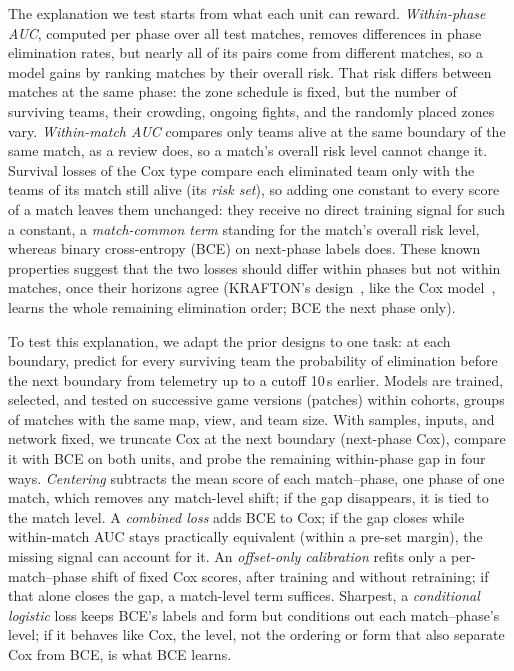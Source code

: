 \documentclass[sigconf,anonymous]{acmart}
\begin{document}
The explanation we test starts from what each unit can reward. \emph{Within-phase AUC}, computed per phase over all test matches, removes differences in phase elimination rates, but nearly all of its pairs come from different matches, so a model gains by ranking matches by their overall risk. That risk differs between matches at the same phase: the zone schedule is fixed, but the number of surviving teams, their crowding, ongoing fights, and the randomly placed zones vary. \emph{Within-match AUC} compares only teams alive at the same boundary of the same match, as a review does, so a match's overall risk level cannot change it. Survival losses of the Cox type compare each eliminated team only with the teams of its match still alive (its \emph{risk set}), so adding one constant to every score of a match leaves them unchanged: they receive no direct training signal for such a constant, a \emph{match-common term} standing for the match's overall risk level, whereas binary cross-entropy (BCE) on next-phase labels does. These known properties suggest that the two losses should differ within phases but not within matches, once their horizons agree (KRAFTON's design~\cite{KRAFTON}, like the Cox model~\cite{Cox72}, learns the whole remaining elimination order; BCE the next phase only).

To test this explanation, we adapt the prior designs to one task: at each boundary, predict for every surviving team the probability of elimination before the next boundary from telemetry up to a cutoff 10\,s earlier. Models are trained, selected, and tested on successive game versions (patches) within cohorts, groups of matches with the same map, view, and team size. With samples, inputs, and network fixed, we truncate Cox at the next boundary (next-phase Cox), compare it with BCE on both units, and probe the remaining within-phase gap in four ways. \emph{Centering} subtracts the mean score of each match--phase, one phase of one match, which removes any match-level shift; if the gap disappears, it is tied to the match level. A \emph{combined loss} adds BCE to Cox; if the gap closes while within-match AUC stays practically equivalent (within a pre-set margin), the missing signal can account for it. An \emph{offset-only calibration} refits only a per-match--phase shift of fixed Cox scores, after training and without retraining; if that alone closes the gap, a match-level term suffices. Sharpest, a \emph{conditional logistic} loss keeps BCE's labels and form but conditions out each match--phase's level; if it behaves like Cox, the level, not the ordering or form that also separate Cox from BCE, is what BCE learns.
\end{document}
